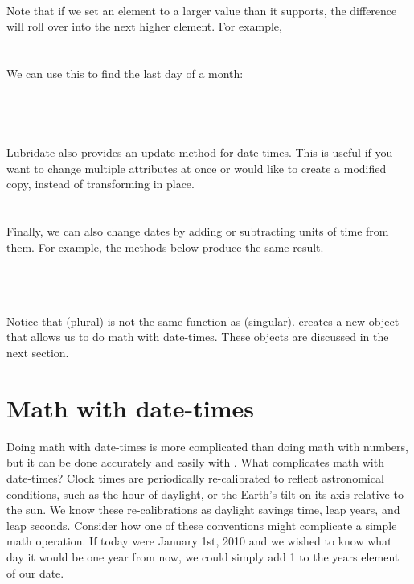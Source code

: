 \documentclass[article]{jss}
\begin{document}
\\

Note that if we set an element to a larger value than it supports, the difference will roll over into the next higher element. For example,\\

\\
\\

We can use this to find the last day of a month:\\

\\
\\
\\
\\


Lubridate also provides an update method for date-times.  This is useful if you want to change multiple attributes at once or would like to create a modified copy, instead of transforming in place.\\

\\
\\

Finally, we can also change dates by adding or subtracting units of time from them. For example, the methods below produce the same result.\\

\\

\\
\\

Notice that  (plural) is not the same function as  (singular).  creates a new object that allows us to do math with date-times. These objects are discussed in the next section. 

\section{Math with date-times}
\label{sec:types}
Doing math with date-times is more complicated than doing math with numbers, but it can be done accurately and easily with . What complicates math with date-times? Clock times are periodically re-calibrated to reflect astronomical conditions, such as the hour of daylight, or the Earth's tilt on its axis relative to the sun. We know these re-calibrations as daylight savings time, leap years, and leap seconds. Consider how one of these conventions might complicate a simple math operation. If today were January 1st, 2010 and we wished to know what day it would be one year from now, we could simply add 1 to the years element of our date.\\
\end{document}
